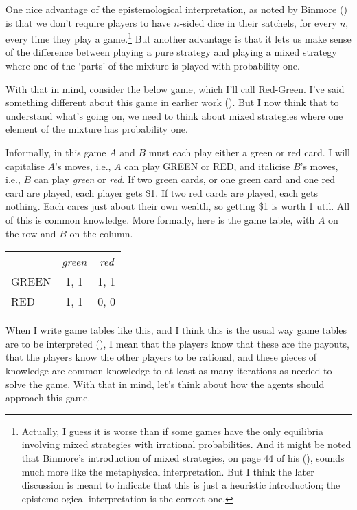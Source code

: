 \documentclass[
  11pt,
  letterpaper,
  DIV=11,
  numbers=noendperiod,
  twoside]{scrartcl}
\begin{document}
One nice advantage of the epistemological interpretation, as noted by
Binmore () is that we don't require
players to have \(n\)-sided dice in their satchels, for every \(n\),
every time they play a game.\footnote{Actually, I guess it is worse than
  if some games have the only equilibria involving mixed strategies with
  irrational probabilities. And it might be noted that Binmore's
  introduction of mixed strategies, on page 44 of his
  (), sounds much more like the
  metaphysical interpretation. But I think the later discussion is meant
  to indicate that this is just a heuristic introduction; the
  epistemological interpretation is the correct one.} But another
advantage is that it lets us make sense of the difference between
playing a pure strategy and playing a mixed strategy where one of the
`parts' of the mixture is played with probability one.

With that in mind, consider the below game, which I'll call Red-Green.
I've said something different about this game in earlier work
(). But I now
think that to understand what's going on, we need to think about mixed
strategies where one element of the mixture has probability one.

Informally, in this game \(A\) and \(B\) must each play either a green
or red card. I will capitalise \(A\)'s moves, i.e., \(A\) can play GREEN
or RED, and italicise \(B\)'s moves, i.e., \(B\) can play \emph{green}
or \emph{red}. If two green cards, or one green card and one red card
are played, each player gets \$1. If two red cards are played, each gets
nothing. Each cares just about their own wealth, so getting \$1 is worth
1 util. All of this is common knowledge. More formally, here is the game
table, with \(A\) on the row and \(B\) on the column.

\begin{longtable}[]{@{}lcc@{}}
\toprule\noalign{}
\endhead
\bottomrule\noalign{}
\endlastfoot
& \emph{green} & \emph{red} \\
GREEN & 1, 1 & 1, 1 \\
RED & 1, 1 & 0, 0 \\
\end{longtable}

When I write game tables like this, and I think this is the usual way
game tables are to be interpreted
(), I mean that
the players know that these are the payouts, that the players know the
other players to be rational, and these pieces of knowledge are common
knowledge to at least as many iterations as needed to solve the game.
With that in mind, let's think about how the agents should approach this
game.
\end{document}
